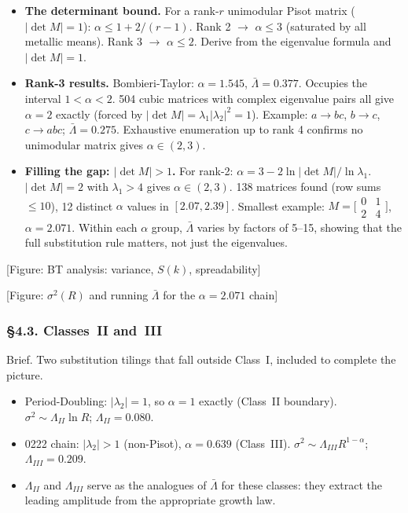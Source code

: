 \documentclass[11pt]{article}
\newcommand{\fig}[1]{{\color{figcolor}\textsf{[Figure: #1]}}}
\newcommand{\Lb}{\bar\Lambda}
\begin{document}
\begin{itemize}[leftmargin=1.5em]
  \item \textbf{The determinant bound.}
        For a rank-$r$ unimodular Pisot matrix ($|\det M| = 1$):
        $\alpha \leq 1 + 2/(r{-}1)$.
        Rank 2 $\to$ $\alpha \leq 3$ (saturated by all metallic means).
        Rank 3 $\to$ $\alpha \leq 2$.
        Derive from the eigenvalue formula and $|\det M| = 1$.

  \item \textbf{Rank-3 results.}
        Bombieri-Taylor: $\alpha = 1.545$, $\Lb = 0.377$. Occupies
        the interval $1 < \alpha < 2$.
        504 cubic matrices with complex eigenvalue pairs all give
        $\alpha = 2$ exactly (forced by $|\det M| = \lambda_1|\lambda_2|^2 = 1$).
        Example: $a \to bc$, $b \to c$, $c \to abc$; $\Lb = 0.275$.
        Exhaustive enumeration up to rank 4 confirms no unimodular
        matrix gives $\alpha \in (2,3)$.

  \item \textbf{Filling the gap: $|\det M| > 1$.}
        For rank-2: $\alpha = 3 - 2\ln|\det M|/\ln\lambda_1$.
        $|\det M| = 2$ with $\lambda_1 > 4$ gives $\alpha \in (2,3)$.
        138 matrices found (row sums $\leq 10$), 12 distinct $\alpha$
        values in $[2.07, 2.39]$.
        Smallest example: $M = \bigl[\begin{smallmatrix}0&1\\2&4\end{smallmatrix}\bigr]$,
        $\alpha = 2.071$.
        Within each $\alpha$ group, $\Lb$ varies by factors of 5--15,
        showing that the full substitution rule matters, not just the
        eigenvalues.
\end{itemize}

\fig{BT analysis: variance, $S(k)$, spreadability}

\fig{$\sigma^2(R)$ and running $\Lb$ for the $\alpha = 2.071$ chain}

\subsubsection{\S4.3. Classes~II and~III}

Brief. Two substitution tilings that fall outside Class~I, included
to complete the picture.

\begin{itemize}[leftmargin=1.5em]
  \item Period-Doubling: $|\lambda_2| = 1$, so $\alpha = 1$ exactly
        (Class~II boundary). $\sigma^2 \sim \Lambda_{II}\ln R$;
        $\Lambda_{II} = 0.080$.
  \item 0222 chain: $|\lambda_2| > 1$ (non-Pisot), $\alpha = 0.639$
        (Class~III). $\sigma^2 \sim \Lambda_{III} R^{1-\alpha}$;
        $\Lambda_{III} = 0.209$.
  \item $\Lambda_{II}$ and $\Lambda_{III}$ serve as the analogues of
        $\Lb$ for these classes: they extract the leading amplitude
        from the appropriate growth law.
\end{itemize}
\end{document}
